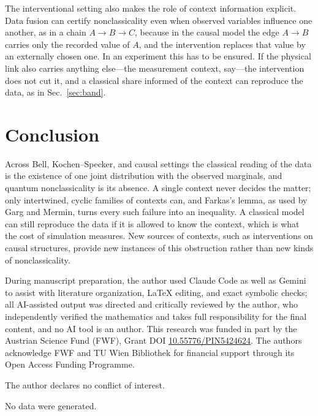 \documentclass[aps,pra,reprint,superscriptaddress,longbibliography,nofootinbib]{revtex4-2}
\begin{document}
The interventional setting also makes the role of context information explicit.
Data fusion can certify nonclassicality even when observed variables influence one another, as in a chain $A\to B\to C$, because in the causal model the edge $A\to B$ carries only the recorded value of $A$, and the intervention replaces that value by an externally chosen one.
In an experiment this has to be ensured.
If the physical link also carries anything else---the measurement context, say---the intervention does not cut it, and a classical share informed of the context can reproduce the data, as in Sec.~\ref{sec:band}.

\section{Conclusion}

Across Bell, Kochen--Specker, and causal settings the classical reading of the data is the existence of one joint distribution with the observed marginals, and quantum nonclassicality is its absence.
A single context never decides the matter; only intertwined, cyclic families of contexts can, and Farkas's lemma, as used by Garg and Mermin, turns every such failure into an inequality.
A classical model can still reproduce the data if it is allowed to know the context, which is what the cost of simulation measures.
New sources of contexts, such as interventions on causal structures, provide new instances of this obstruction rather than new kinds of nonclassicality.

\begin{acknowledgments}
During manuscript preparation, the author used Claude Code as well as Gemini to assist with literature organization,
LaTeX editing, and exact symbolic checks;
all AI-assisted output was directed and critically reviewed by the author,
 who independently verified the mathematics and takes full responsibility for the final content, and no AI tool is an author.
This research was funded in part by the Austrian
Science Fund (FWF), Grant DOI \href{https://doi.org/10.55776/PIN5424624}{10.55776/PIN5424624}.
The authors acknowledge FWF and TU Wien Bibliothek for financial support through its Open Access Funding Programme.

The author declares no conflict of interest.

No data were generated.
\end{acknowledgments}


\end{document}
